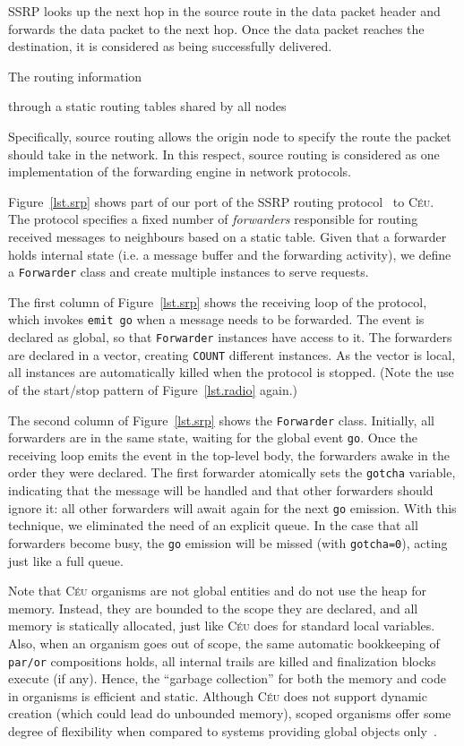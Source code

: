 \documentclass{sigplanconf}
\newcommand{\CEU}{\textsc{C\'{e}u}\xspace}
\newcommand{\code}[1] {{\small{\texttt{#1}}}}
\newcommand{\1}{\;}
\newcommand{\2}{\;\;}
\newcommand{\3}{\;\;\;}
\newcommand{\5}{\;\;\;\;\;}
\begin{document}
 SSRP
looks up the next hop in the source route in the data packet header and
forwards the data packet to the next hop. Once the data packet reaches
the destination, it is considered as being successfully delivered.

The routing information 

 through a static routing tables shared by all nodes

Specifically, source routing allows the origin node to
specify the route the packet should take in the network. In this
respect, source routing is considered as one implementation of the
forwarding engine in network protocols.

Figure~\ref{lst.srp} shows part of our port of the SSRP routing 
protocol~\cite{wsn.teps} to \CEU.
The protocol specifies a fixed number of \emph{forwarders} responsible for 
routing received messages to neighbours based on a static table.
Given that a forwarder holds internal state (i.e. a message buffer and the 
forwarding activity), we define a \code{Forwarder} class and create multiple 
instances to serve requests.

The first column of Figure~\ref{lst.srp} shows the receiving loop of the 
protocol, which invokes \code{emit~go} when a message needs to be forwarded.
The event is declared as global, so that \code{Forwarder} instances have access 
to it.
The forwarders are declared in a vector, creating \code{COUNT} different 
instances.
As the vector is local, all instances are automatically killed when the 
protocol is stopped.
(Note the use of the start/stop pattern of Figure~\ref{lst.radio} again.)

The second column of Figure~\ref{lst.srp} shows the \code{Forwarder} class.
Initially, all forwarders are in the same state, waiting for the global event 
\code{go}.
Once the receiving loop emits the event in the top-level body, the forwarders 
awake in the order they were declared.
The first forwarder atomically sets the \code{gotcha} variable, indicating that 
the message will be handled and that other forwarders should ignore it:
all other forwarders will await again for the next \code{go} emission.
With this technique, we eliminated the need of an explicit queue.
In the case that all forwarders become busy, the \code{go} emission will be 
missed (with \code{gotcha=0}), acting just like a full queue.

Note that \CEU organisms are not global entities and do not use the heap for 
memory.
Instead, they are bounded to the scope they are declared, and all memory is 
statically allocated, just like \CEU does for standard local variables.
Also, when an organism goes out of scope, the same automatic bookkeeping of 
\code{par/or} compositions holds, all internal trails are killed and 
finalization blocks execute (if any).
Hence, the ``garbage collection'' for both the memory and code in organisms is 
efficient and static.
Although \CEU does not support dynamic creation (which could lead do unbounded 
memory), scoped organisms offer some degree of flexibility when compared to 
systems providing global objects only~\cite{wsn.virgil,wsn.flowtalk}.
\end{document}
